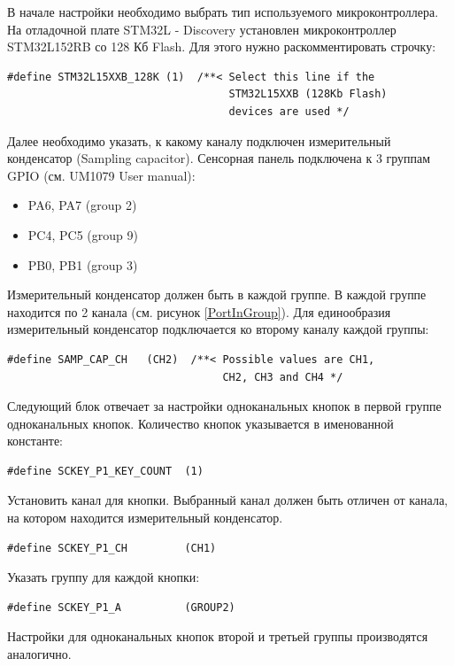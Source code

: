 	В начале настройки необходимо выбрать тип используемого микроконтроллера. На отладочной плате STM32L - Discovery установлен микроконтроллер STM32L152RB со 128 Кб Flash. Для этого нужно раскомментировать строчку:
\begin{verbatim}
#define STM32L15XXB_128K (1)  /**< Select this line if the 
                                   STM32L15XXB (128Kb Flash) 
                                   devices are used */
\end{verbatim}
Далее необходимо указать, к какому каналу подключен измерительный конденсатор (Sampling capacitor). Сенсорная панель подключена к 3 группам GPIO (см. UM1079 User manual):
\begin{itemize}
\item PA6, PA7 (group 2)
\item PC4, PC5 (group 9)
\item PB0, PB1 (group 3)
\end{itemize}
Измерительный конденсатор должен быть в каждой группе. В каждой группе находится по 2 канала (см. рисунок \ref{PortInGroup}). Для единообразия измерительный конденсатор подключается ко второму каналу каждой группы:
\begin{verbatim}
#define SAMP_CAP_CH   (CH2)  /**< Possible values are CH1, 
                                  CH2, CH3 and CH4 */
\end{verbatim}
Следующий блок отвечает за настройки одноканальных кнопок в первой группе одноканальных кнопок. Количество кнопок указывается в именованной константе:
\begin{verbatim}
#define SCKEY_P1_KEY_COUNT  (1)
\end{verbatim}
Установить канал для кнопки. Выбранный канал должен быть отличен от канала, на котором находится измерительный конденсатор.
\begin{verbatim}
#define SCKEY_P1_CH         (CH1)
\end{verbatim}
Указать группу для каждой кнопки:
\begin{verbatim}
#define SCKEY_P1_A          (GROUP2)
\end{verbatim}
Настройки для одноканальных кнопок второй и третьей группы производятся аналогично. 

